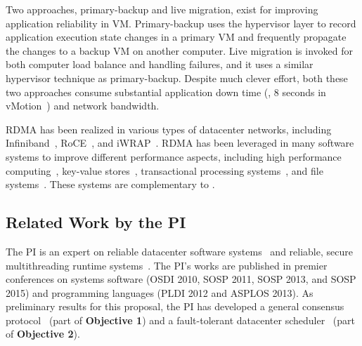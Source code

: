  Two approaches, primary-backup and live 
migration, exist for improving application reliability in VM. Primary-backup 
uses the hypervisor layer to record application execution state changes in a 
primary VM and frequently propagate the changes to a backup VM on another 
computer. Live migration is invoked for both computer load balance and handling 
failures, and it uses a similar hypervisor technique as primary-backup. Despite 
much clever effort, both these two approaches consume substantial application 
down time (\eg, 8 seconds in vMotion~\cite{vmotion:atc05}) and network 
bandwidth.


 RDMA has been realized in various types of datacenter 
networks, including Infiniband~\cite{infiniband}, RoCE~\cite{roce}, and 
iWRAP~\cite{iwrap}. RDMA has been leveraged in many software systems to improve 
different performance aspects, including high performance 
computing~\cite{openmpi}, key-value 
stores~\cite{pilaf:usenix14,herd:sigcomm14,farm:nsdi14,memcached:rdma}, 
transactional processing systems~\cite{drtm:sosp15,farm:sosp15}, and file 
systems~\cite{gibson:nfs}. These systems are complementary to \xxx.

\vspace{-.15in}\subsection{Related Work by the PI} 
\label{sec:my-work}\vspace{-.075in}
% 

The PI is an expert on reliable datacenter software systems~\cite{crane:sosp15, 
tripod:apsys16} and reliable, secure multithreading runtime 
systems~\cite{smt:cacm, cui:tern:osdi10, peregrine:sosp11, parrot:sosp13}. The 
PI's works are published in premier conferences on systems software (OSDI 2010, 
SOSP 2011, SOSP 2013, and SOSP 2015) and programming languages (PLDI 2012 and 
ASPLOS 2013). As preliminary results for this \xxx proposal, the PI has 
developed a general consensus protocol~\cite{crane:sosp15} (part of 
\textbf{Objective 1}) and a fault-tolerant datacenter 
scheduler~\cite{tripod:apsys16} (part of \textbf{Objective 2}).




